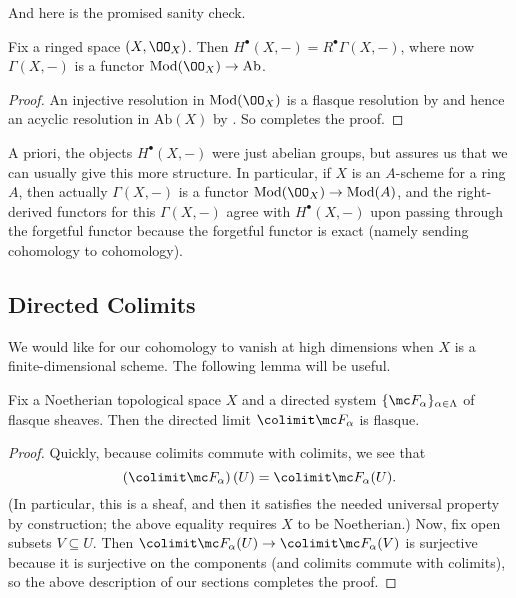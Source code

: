 \documentclass[../notes.tex]{subfiles}
\begin{document}
And here is the promised sanity check.
\begin{proposition} \label{prop:ox-cohomology}
	Fix a ringed space $(X,\OO_X)$. Then $H^\bullet(X,-)=R^\bullet\Gamma(X,-)$, where now $\Gamma(X,-)$ is a functor $\mathrm{Mod}(\OO_X)\to\mathrm{Ab}$.
\end{proposition}
\begin{proof}
	An injective resolution in $\mathrm{Mod}(\OO_X)$ is a flasque resolution by  and hence an acyclic resolution in $\mathrm{Ab}(X)$ by . So  completes the proof.
\end{proof}
\begin{remark}
	A priori, the objects $H^\bullet(X,-)$ were just abelian groups, but  assures us that we can usually give this more structure. In particular, if $X$ is an $A$-scheme for a ring $A$, then actually $\Gamma(X,-)$ is a functor $\mathrm{Mod}(\OO_X)\to\mathrm{Mod}(A)$, and the right-derived functors for this $\Gamma(X,-)$ agree with $H^\bullet(X,-)$ upon passing through the forgetful functor because the forgetful functor is exact (namely sending cohomology to cohomology).
\end{remark}

\subsection{Directed Colimits}
We would like for our cohomology to vanish at high dimensions when $X$ is a finite-dimensional scheme. The following lemma will be useful.
\begin{lemma} \label{lem:direct-limit-flasque}
	Fix a Noetherian topological space $X$ and a directed system $\{\mc F_\alpha\}_{\alpha\in\Lambda}$ of flasque sheaves. Then the directed limit $\colimit\mc F_\alpha$ is flasque.
\end{lemma}
\begin{proof}
	Quickly, because colimits commute with colimits, we see that
	\[\left(\colimit\mc F_\alpha\right)(U)=\colimit\mc F_\alpha(U).\]
	(In particular, this is a sheaf, and then it satisfies the needed universal property by construction; the above equality requires $X$ to be Noetherian.) Now, fix open subsets $V\subseteq U$. Then $\colimit\mc F_\alpha(U)\to\colimit\mc F_\alpha(V)$ is surjective because it is surjective on the components (and colimits commute with colimits), so the above description of our sections completes the proof.
\end{proof}
\end{document}
